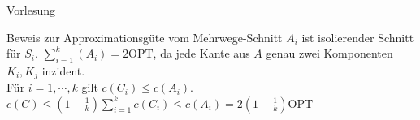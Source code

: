 \begin{section}{Vorlesung}
  \begin{subsection}{Beweis zur Approximationsgüte vom Mehrwege-Schnitt}
    $A_i$ ist isolierender Schnitt für $S_i$. $\sum_{i=1}^k (A_i) = 2\text{OPT}$, da jede Kante aus $A$ genau zwei Komponenten $K_i, K_j$ inzident.\\
    Für $i=1,\cdots,k$ gilt $c(C_i) \leq c(A_i)$. \\
    $c(C) \leq (1-\frac{1}{k})\sum_{i=1}^k c(C_i) \leq c(A_i) = 2(1-\frac{1}{k})\text{OPT}$
  \end{subsection}
\end{section}
